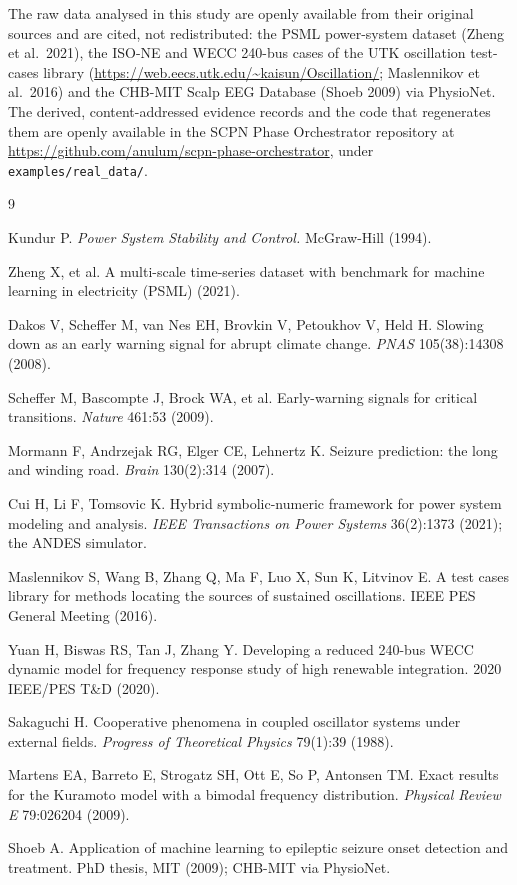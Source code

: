 \documentclass[aip,cha,preprint,amsmath,amssymb]{revtex4-2}
\newcommand{\code}[1]{\texttt{#1}}
\begin{document}
The raw data analysed in this study are openly available from their
original sources and are cited, not redistributed: the PSML power-system
dataset (Zheng et al.\ 2021), the ISO-NE and WECC 240-bus cases of the
UTK oscillation test-cases library
(\url{https://web.eecs.utk.edu/~kaisun/Oscillation/}; Maslennikov et
al.\ 2016) and the CHB-MIT Scalp EEG Database (Shoeb 2009) via PhysioNet. The
derived, content-addressed evidence records and the code that
regenerates them are openly available in the SCPN Phase Orchestrator
repository at \url{https://github.com/anulum/scpn-phase-orchestrator},
under \code{examples/real\_data/}.

\begin{thebibliography}{9}

 Kundur P. \emph{Power System Stability and
Control.} McGraw-Hill (1994).

 Zheng X, et al. A multi-scale time-series dataset
with benchmark for machine learning in electricity (PSML) (2021).

 Dakos V, Scheffer M, van Nes EH, Brovkin V,
Petoukhov V, Held H. Slowing down as an early warning signal for abrupt
climate change. \emph{PNAS} 105(38):14308 (2008).

 Scheffer M, Bascompte J, Brock WA, et al.
Early-warning signals for critical transitions. \emph{Nature} 461:53
(2009).

 Mormann F, Andrzejak RG, Elger CE, Lehnertz K.
Seizure prediction: the long and winding road. \emph{Brain} 130(2):314
(2007).

 Cui H, Li F, Tomsovic K. Hybrid symbolic-numeric
framework for power system modeling and analysis. \emph{IEEE
Transactions on Power Systems} 36(2):1373 (2021); the ANDES simulator.

 Maslennikov S, Wang B, Zhang Q, Ma F, Luo X,
Sun K, Litvinov E. A test cases library for methods locating the
sources of sustained oscillations. IEEE PES General Meeting (2016).

 Yuan H, Biswas RS, Tan J, Zhang Y. Developing a
reduced 240-bus WECC dynamic model for frequency response study of high
renewable integration. 2020 IEEE/PES T\&D (2020).

 Sakaguchi H. Cooperative phenomena in coupled
oscillator systems under external fields. \emph{Progress of
Theoretical Physics} 79(1):39 (1988).

 Martens EA, Barreto E, Strogatz SH, Ott E, So P,
Antonsen TM. Exact results for the Kuramoto model with a bimodal
frequency distribution. \emph{Physical Review E} 79:026204 (2009).

 Shoeb A. Application of machine learning to
epileptic seizure onset detection and treatment. PhD thesis, MIT
(2009); CHB-MIT via PhysioNet.

\end{thebibliography}
\end{document}

